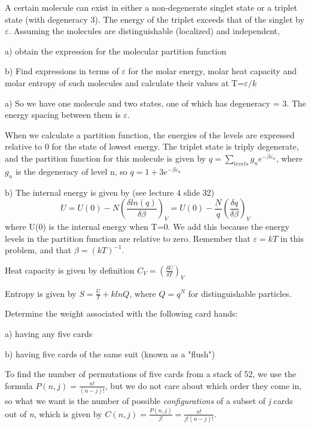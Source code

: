 \documentclass[addpoints,12pt]{exam}
\begin{document}
\begin{questions}
\question A certain molecule can exist in either a non-degenerate singlet state or a triplet state (with degeneracy 3). The energy of the triplet exceeds that of the singlet by \(\varepsilon\). Assuming the molecules are distinguishable (localized) and independent, 

a) obtain the expression for the molecular partition function

b) Find expressions in terms of \(\varepsilon\) for the molar energy, molar heat capacity and molar entropy of such molecules and calculate their values at T=\(\varepsilon /k\)

\begin{solution} a) So we have one molecule and two states, one of which has degeneracy = 3. The energy spacing between them is \(\varepsilon\). 

When we calculate a partition function, the energies of the levels are expressed relative to 0 for the state of lowest energy. The triplet state is triply  degenerate, and the partition function for this molecule is given by \(q = \sum_{levels}g_ne^{-\beta\varepsilon_n}\), where \(g_n\) is the degeneracy of level n, so \(q = 1 + 3e^{-\beta\varepsilon_n}\)

\medskip b) The internal energy is given by (see lecture 4 slide 32) \[U = U(0) - N\left(\frac{\delta ln(q)}{\delta\beta}\right)_V = U(0) - \frac{N}{q}\left(\frac{\delta q}{\delta\beta}\right)_V\]
where U(0) is the internal energy when T=0. We add this because the energy levels in the partition function are relative to zero. Remember that \(\varepsilon = kT\) in this problem, and that \(\beta = (kT)^{-1}\).

\medskip Heat capacity is given by definition \(C_V=\left(\frac{\delta U}{\delta T}\right)_V\)

\medskip Entropy is given by \(S=\frac{U}{T} + klnQ\), where \(Q=q^N\) for distinguishable particles.
\end{solution}

\question Determine the weight associated with the following card hands:

a) having any five cards

b) having five cards of the same suit (known as a "flush")

\begin{solution} To find the number of permutations of five cards from a stack of 52, we use the formula \(P(n,j) = \frac{n!}{(n-j)!}\), but we do not care about which order they come in, so what we want is the number of possible \textit{configurations} of a subset of \textit{j} cards out of \textit{n}, which is given by \(C(n,j) = \frac{P(n,j)}{j!} = \frac{n!}{j!(n-j)!}\). 


\end{solution}
\end{questions}
\end{document}
